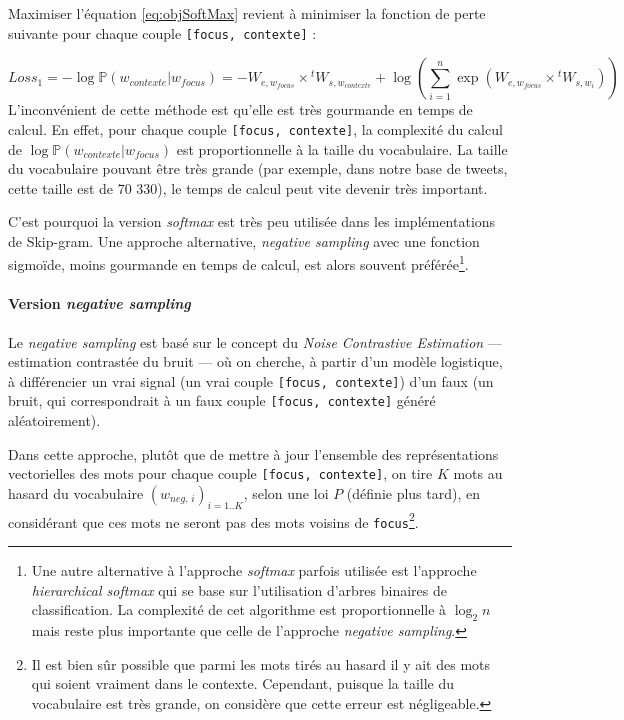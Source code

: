 \documentclass[11pt,french,french]{article}
\let\rmarkdownfootnote\footnote%
\def\footnote{\protect\rmarkdownfootnote}
\begin{document}
Maximiser l'équation \eqref{eq:objSoftMax} revient à minimiser la fonction
de perte suivante pour chaque couple \texttt{{[}focus,\ contexte{]}} :

\[
Loss_{1}=-\log\mathbb P(w_{contexte}\vert w_{focus}) =
-W_{e,w_{focus}}\times {}^tW_{s,w_{contexte}}+
\log\left(\sum_{i=1}^n\exp(W_{e,w_{focus}}\times {}^t W_{s,w_i})\right)
\] L'inconvénient de cette méthode est qu'elle est très gourmande en
temps de calcul. En effet, pour chaque couple
\texttt{{[}focus,\ contexte{]}}, la complexité du calcul de
\(\log\mathbb P(w_{contexte}\vert w_{focus})\) est proportionnelle à la
taille du vocabulaire. La taille du vocabulaire pouvant être très grande
(par exemple, dans notre base de tweets, cette taille est de 70 330), le
temps de calcul peut vite devenir très important.

C'est pourquoi la version \emph{softmax} est très peu utilisée dans les
implémentations de Skip-gram. Une approche alternative, \emph{negative
sampling} avec une fonction sigmoïde, moins gourmande en temps de
calcul, est alors souvent préférée\footnote{Une autre alternative à
  l'approche \emph{softmax} parfois utilisée est l'approche
  \emph{hierarchical softmax} qui se base sur l'utilisation d'arbres
  binaires de classification. La complexité de cet algorithme est
  proportionnelle à \(\log_2n\) mais reste plus importante que celle de
  l'approche \emph{negative sampling}.}.

\paragraph{\texorpdfstring{Version \emph{negative
sampling}}{Version negative sampling}}\label{subsec:negsampling}

Le \emph{negative sampling} est basé sur le concept du \emph{Noise
Contrastive Estimation} --- estimation contrastée du bruit --- où on
cherche, à partir d'un modèle logistique, à différencier un vrai signal
(un vrai couple \texttt{{[}focus,\ contexte{]}}) d'un faux (un bruit,
qui correspondrait à un faux couple \texttt{{[}focus,\ contexte{]}}
généré aléatoirement).

Dans cette approche, plutôt que de mettre à jour l'ensemble des
représentations vectorielles des mots pour chaque couple
\texttt{{[}focus,\ contexte{]}}, on tire \(K\) mots au hasard du
vocabulaire \((w_{neg,\,i})_{i=1..K}\), selon une loi \(P\) (définie
plus tard), en considérant que ces mots ne seront pas des mots voisins
de \texttt{focus}\footnote{Il est bien sûr possible que parmi les mots
  tirés au hasard il y ait des mots qui soient vraiment dans le
  contexte. Cependant, puisque la taille du vocabulaire est très grande,
  on considère que cette erreur est négligeable.}.
\end{document}
